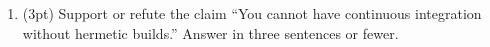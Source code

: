 \documentclass{report}
\newif\ifkey
\newcommand{\answervvshort}[1]{\ifkey\color{red}\underline{\textbf{#1}}\color{black}\else\underline{\hspace{0.5in}}\fi\xspace}
\newcommand{\answerlong}[1]{\ifkey\color{red}\textbf{#1}\color{black}\else\vspace{0.5in}\fi\xspace}
\newcommand*{\pts}[1]{\addtocounter{points}{#1}(#1pt)}
\begin{document}
\begin{spacing}{1.4}
\begin{enumerate}[leftmargin=*]


\item \pts{3} Support or refute the claim ``You cannot have continuous integration without hermetic builds.''
  Answer in three sentences or fewer.\\
  \answerlong{Likely support. Continuous integration does not work well without hermetic builds, because to test in CI you need to be able to build from
    scratch.}
  

\end{enumerate}
\end{spacing}
\end{document}
